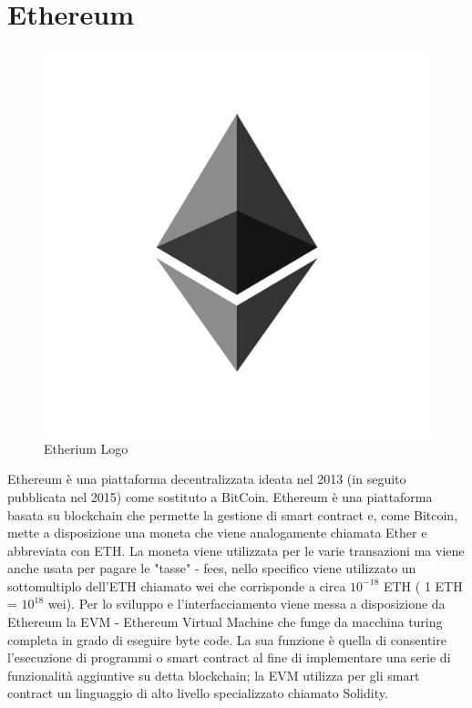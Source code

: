 \documentclass[11pt,a4paper,titlepage,twoside,openright]{report}
\begin{document}
\section{Ethereum}

\begin{figure}[h]
	\includegraphics[height=0.2\textheight]{eth}
	\centering
	\caption{Etherium Logo}
	\label{fig:eth-logo}
\end{figure}

Ethereum è una piattaforma decentralizzata ideata nel 2013 (in seguito pubblicata nel 2015) come sostituto a BitCoin. Ethereum è una piattaforma basata su blockchain che permette la gestione di smart contract e, come Bitcoin, mette a disposizione una moneta che viene analogamente chiamata Ether e abbreviata con ETH. La moneta viene utilizzata per le varie transazioni ma viene anche usata per pagare le "tasse" - fees, nello specifico viene utilizzato un sottomultiplo dell'ETH chiamato wei che corrisponde a circa  $ 10^{-18} $ ETH  ( 1 ETH = $ 10^{18} $ wei). Per lo sviluppo e l'interfacciamento viene messa a disposizione da Ethereum la EVM - Ethereum Virtual Machine che funge da macchina turing completa in grado di eseguire byte code. La sua funzione è quella di consentire l'esecuzione di programmi o smart contract al fine di implementare una serie di funzionalità aggiuntive su detta blockchain; la EVM utilizza per gli smart contract un linguaggio di alto livello specializzato chiamato Solidity.
\end{document}

